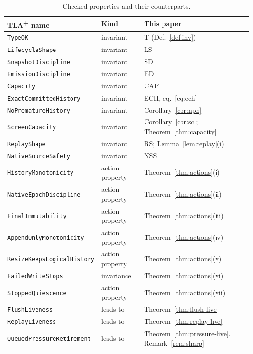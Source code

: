 \documentclass[11pt]{article}
\newcommand{\tla}[1]{\texttt{#1}}
\theoremstyle{definition}
\theoremstyle{remark}
\begin{document}
\begin{table}[htbp]
\centering\small
\begin{tabular}{@{}lll@{}}
\toprule
TLA\textsuperscript{+} name & Kind & This paper \\
\midrule
\tla{TypeOK} & invariant & T (Def.~\ref{def:inv}) \\
\tla{LifecycleShape} & invariant & LS \\
\tla{SnapshotDiscipline} & invariant & SD \\
\tla{EmissionDiscipline} & invariant & ED \\
\tla{Capacity} & invariant & CAP \\
\tla{ExactCommittedHistory} & invariant & ECH, eq.~\eqref{eq:ech} \\
\tla{NoPrematureHistory} & invariant & Corollary~\ref{cor:nph} \\
\tla{ScreenCapacity} & invariant & Corollary~\ref{cor:sc};
  Theorem~\ref{thm:capacity} \\
\tla{ReplayShape} & invariant & RS; Lemma~\ref{lem:replay}(i) \\
\tla{NativeSourceSafety} & invariant & NSS \\
\midrule
\tla{HistoryMonotonicity} & action property & Theorem~\ref{thm:actions}(i) \\
\tla{NativeEpochDiscipline} & action property &
  Theorem~\ref{thm:actions}(ii) \\
\tla{FinalImmutability} & action property & Theorem~\ref{thm:actions}(iii) \\
\tla{AppendOnlyMonotonicity} & action property &
  Theorem~\ref{thm:actions}(iv) \\
\tla{ResizeKeepsLogicalHistory} & action property &
  Theorem~\ref{thm:actions}(v) \\
\tla{FailedWriteStops} & invariance & Theorem~\ref{thm:actions}(vi) \\
\tla{StoppedQuiescence} & action property & Theorem~\ref{thm:actions}(vii) \\
\tla{FlushLiveness} & leads-to & Theorem~\ref{thm:flush-live} \\
\tla{ReplayLiveness} & leads-to & Theorem~\ref{thm:replay-live} \\
\tla{QueuedPressureRetirement} & leads-to &
  Theorem~\ref{thm:pressure-live}, Remark~\ref{rem:sharp} \\
\bottomrule
\end{tabular}
\caption{Checked properties and their counterparts.}
\label{tab:props}
\end{table}
\end{document}
